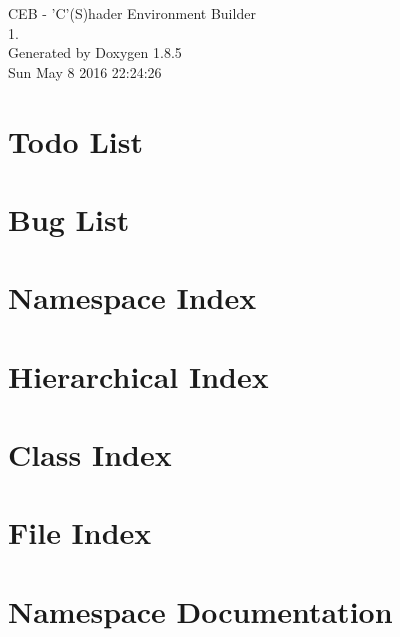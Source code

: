 \documentclass[twoside]{book}
\newcommand{\clearemptydoublepage}{%
  \newpage{\pagestyle{empty}\cleardoublepage}%
}
\begin{document}
\begin{titlepage}
\vspace*{7cm}
\begin{center}%
{\Large C\-E\-B -\/ 'C'(S)hader Environment Builder \\[1ex]\large 1. }\\
\vspace*{1cm}
{\large Generated by Doxygen 1.8.5}\\
\vspace*{0.5cm}
{\small Sun May 8 2016 22:24:26}\\
\end{center}
\end{titlepage}
\clearemptydoublepage
\tableofcontents
\clearemptydoublepage
{}

\chapter{Todo List}
\label{todo}

\chapter{Bug List}
\label{bug}

\chapter{Namespace Index}

\chapter{Hierarchical Index}

\chapter{Class Index}

\chapter{File Index}

\chapter{Namespace Documentation}



\end{document}
